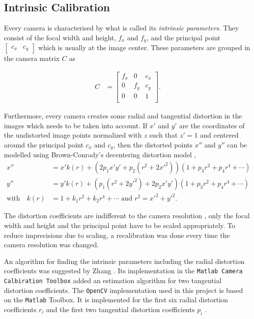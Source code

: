 
\subsection{Intrinsic Calibration}
\label{sec:intrinsic}

Every camera is characterised by what is called its \textit{intrinsic parameters}. They consist of the focal width and height, $f_x$ and $f_y$, and the principal point $\begin{bmatrix} c_x &  c_y\end{bmatrix}$ which is usually at the image center. These parameters are grouped in the camera matrix $C$ as

\begin{align}
    C &= \begin{bmatrix}
        f_x & 0 & c_x \\
        0 & f_y & c_y \\
        0 & 0 & 1 \\
    \end{bmatrix}.
\end{align}

Furthermore, every camera creates some radial and tangential distortion in the images which needs to be taken into account. 
If $x'$ and $y'$ are the coordinates of the undistorted image points normalized with $z$ such that $z'=1$ and centered around the principal point $c_x$ and $c_y$, then the distorted points $x''$ and $y''$ can be modelled using Brown-Conrady's decentering distortion model \cite{Brown1966}, \cite{Conrady1919}
\begin{align}
    x'' &= x' k(r) + (2p_1 x' y' + p_2(r^2 + 2x'^2))(1+p_3r^2+p_4r^4 + \cdots) \\
    y'' &= y' k(r) + (p_1(r^2+2y'^2) + 2p_2x'y')(1+p_3r^2+p_4r^4 + \cdots) \\
    \text{with} \quad k(r) &= 1+k_1r^2+k_2r^4 + \cdots \text{  and } r^2=x'^2+y'^2.
\end{align}

The distortion coefficients are indifferent to the camera resolution \cite{calib3d}, only the focal width and height and the principal point have to be scaled appropriately. To reduce imprecisions due to scaling, a recalibration was done every time the camera resolution was changed.

An algorithm for finding the intrinsic parameters including the radial distortion coefficients was suggested by Zhang \cite{Zhang2000}. 
Its implementation in the \texttt{Matlab Camera Calbiration Toolbox} added an estimation algorithm for two tangential distortion coefficients. \cite{MTB}
The \texttt{OpenCV} implementation used in this project is based on the \texttt{Matlab} Toolbox. 
It is implemented for the first six radial distortion coefficients $r_i$ and the first two tangential distortion coefficients $p_i$ \cite{calib3d}.

